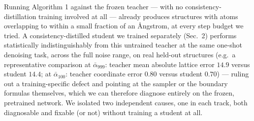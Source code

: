 \documentclass{article}
\begin{document}
Running Algorithm 1 against the frozen teacher --- with no consistency-distillation training involved at all --- already produces structures with atoms overlapping to within a small fraction of an \r{A}ngstrom, at every step budget we tried. A consistency-distilled student we trained separately (Sec.~2) performs statistically indistinguishably from this untrained teacher at the same one-shot denoising task, across the full noise range, on real held-out structures (e.g.\ a representative comparison at $\bar\alpha_{999}$: teacher mean absolute lattice error $14.9$ versus student $14.4$; at $\bar\alpha_{100}$: teacher coordinate error $0.80$ versus student $0.70$) --- ruling out a training-specific defect and pointing at the sampler or the boundary formulas themselves, which we can therefore diagnose entirely on the frozen, pretrained network. We isolated two independent causes, one in each track, both diagnosable and fixable (or not) without training a student at all.
\end{document}
